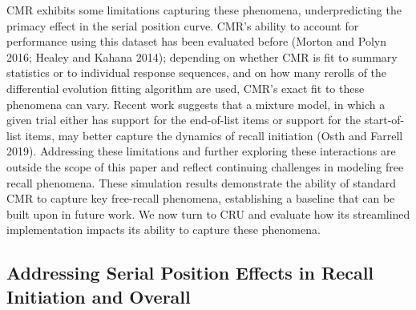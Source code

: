 \documentclass[
  letterpaper,
  DIV=11,
  numbers=noendperiod]{scrartcl}
\begin{document}
CMR exhibits some limitations capturing these phenomena, underpredicting
the primacy effect in the serial position curve. CMR's ability to
account for performance using this dataset has been evaluated before
(Morton and Polyn 2016; Healey and Kahana 2014); depending on whether
CMR is fit to summary statistics or to individual response sequences,
and on how many rerolls of the differential evolution fitting algorithm
are used, CMR's exact fit to these phenomena can vary. Recent work
suggests that a mixture model, in which a given trial either has support
for the end-of-list items or support for the start-of-list items, may
better capture the dynamics of recall initiation (Osth and Farrell
2019). Addressing these limitations and further exploring these
interactions are outside the scope of this paper and reflect continuing
challenges in modeling free recall phenomena. These simulation results
demonstrate the ability of standard CMR to capture key free-recall
phenomena, establishing a baseline that can be built upon in future
work. We now turn to CRU and evaluate how its streamlined implementation
impacts its ability to capture these phenomena.

\subsection{Addressing Serial Position Effects in Recall Initiation and
Overall}\label{addressing-serial-position-effects-in-recall-initiation-and-overall}
\end{document}
